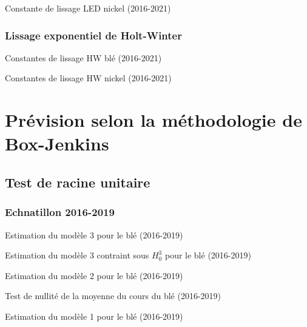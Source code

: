 \documentclass[12pt,a4paper]{article}
\begin{document}
\begin{table}[H]
    \centering
    \caption{Constante de lissage LED nickel (2016-2021)}
    \sffamily
    
    \label{tab:led_nickel21}
\end{table}

\subsubsection{Lissage exponentiel de Holt-Winter}
\begin{table}[H]
    \centering
    \caption{Constantes de lissage HW blé (2016-2021)}
    \sffamily
    
    \label{tab:hw_ble}
\end{table}
\begin{table}[H]
    \centering
    \caption{Constantes de lissage HW nickel (2016-2021)}
    \sffamily
    
    \label{tab:hw_nickel}
\end{table}

\section{Prévision selon la méthodologie de Box-Jenkins}
\setcounter{table}{0}
\setcounter{figure}{0}
\subsection{Test de racine unitaire}
\subsubsection{Echnatillon 2016-2019}
\begin{table}[H]
    \centering
    \caption{Estimation du modèle 3 pour le blé (2016-2019)}
    \sffamily
    
    \label{tab:mod3_ble19}
\end{table}

\begin{table}[H]
    \centering
    \caption{Estimation du modèle 3 contraint sous $H_{0}^{3}$ pour le blé (2016-2019)}
    \sffamily
    
    \label{tab:mod3cont_ble19}
\end{table}

\begin{table}[H]
    \centering
    \caption{Estimation du modèle 2 pour le blé (2016-2019)}
    \sffamily
    
    \label{tab:mod2_ble19}
\end{table}

\begin{table}[H]
    \centering
    \caption{Test de nullité de la moyenne du cours du blé (2016-2019)}
    \sffamily
    
    \label{tab:testmoy_ble19}
\end{table}

\begin{table}[H]
    \centering
    \caption{Estimation du modèle 1 pour le blé (2016-2019)}
    \sffamily
    
    \label{tab:mod1_ble19}
\end{table}
\end{document}
